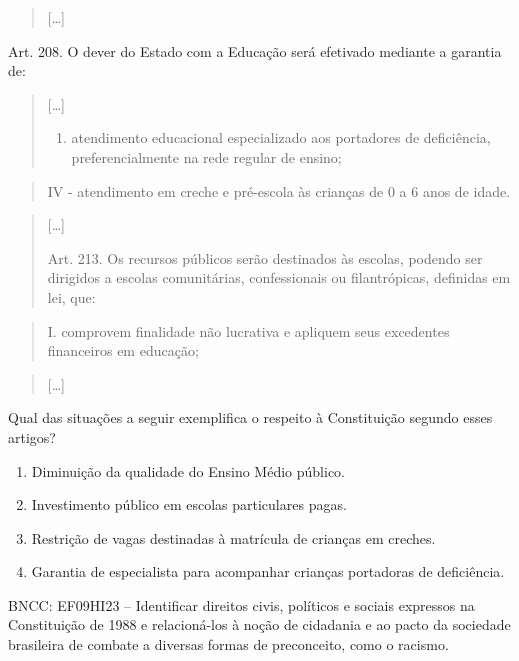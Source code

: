 \begin{quote}
{[}\ldots{}{]}
\end{quote}

Art. 208. O dever do Estado com a Educação será efetivado mediante a
garantia de:

\begin{quote}
{[}\ldots{}{]}

\begin{enumerate}
\def\labelenumi{\Roman{enumi}.}
\setcounter{enumi}{2}
\tightlist
\item
  atendimento educacional especializado aos portadores de deficiência,
  preferencialmente na rede regular de ensino;
\end{enumerate}
\end{quote}

\begin{quote}
IV - atendimento em creche e pré-escola às crianças de 0 a 6 anos de
idade.
\end{quote}

\begin{quote}
{[}\ldots{}{]}

Art. 213. Os recursos públicos serão destinados às escolas, podendo ser
dirigidos a escolas comunitárias, confessionais ou filantrópicas,
definidas em lei, que:
\end{quote}

\begin{quote}
I. comprovem finalidade não lucrativa e apliquem seus excedentes
financeiros em educação;
\end{quote}

\begin{quote}
{[}\ldots{}{]}
\end{quote}

Qual das situações a seguir exemplifica o respeito à Constituição
segundo esses artigos?

\begin{enumerate}
\def\labelenumi{\alph{enumi})}
\item
  Diminuição da qualidade do Ensino Médio público.
\item
  Investimento público em escolas particulares pagas.
\item
  Restrição de vagas destinadas à matrícula de crianças em creches.
\item
  Garantia de especialista para acompanhar crianças portadoras de
  deficiência.
\end{enumerate}

BNCC: EF09HI23 -- Identificar direitos civis, políticos e sociais
expressos na Constituição de 1988 e relacioná-los à noção de cidadania e
ao pacto da sociedade brasileira de combate a diversas formas de
preconceito, como o racismo.

